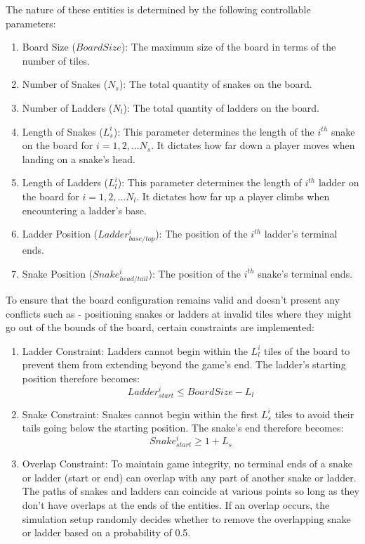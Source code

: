 \documentclass[12pt]{report}
\begin{document}
	The nature of these entities is determined by the following controllable parameters:
	\begin{enumerate}
		\item Board Size ($BoardSize$): The maximum size of the board in terms of the number of tiles.
		\item Number of Snakes ($N_{s}$): The total quantity of snakes on the board.
		\item Number of Ladders ($N_{l}$): The total quantity of ladders on the board.
		\item Length of Snakes ($L^{i}_{s}$): This parameter determines the length of the $i^{th}$ snake on the board for $i=1,2,... N_{s}$. It dictates how far down a player moves when landing on a snake's head.
		\item Length of Ladders ($L^{i}_{l}$): This parameter determines the length of $i^{th}$ ladder on the board for $i=1,2,... N_{l}$. It dictates how far up a player climbs when encountering a ladder's base.
		\item Ladder Position ($Ladder^{i}_{base/top}$): The position of the $i^{th}$ ladder's terminal ends.
		\item Snake Position ($Snake^{i}_{head/tail}$): The position of the $i^{th}$ snake's terminal ends.
	\end{enumerate}
	
	To ensure that the board configuration remains valid and doesn't present any conflicts such as - positioning snakes or ladders at invalid tiles where they might go out of the bounds of the board, certain constraints are implemented:
	
	\begin{enumerate}
		\item Ladder Constraint: Ladders cannot begin within the $L^{i}_{l}$ tiles of the board to prevent them from extending beyond the game's end. The ladder's starting position therefore becomes:  $$Ladder^{i}_{start} \leq BoardSize - L_{l}$$
		\item Snake Constraint: Snakes cannot begin within the first $L^{i}_{s}$ tiles to avoid their tails going below the starting position. The snake's end therefore becomes: $$Snake^{i}_{start}\geq 1 + L_{s}$$
		\item Overlap Constraint: To maintain game integrity, no terminal ends of a snake or ladder (start or end) can overlap with any part of another snake or ladder. The paths of snakes and ladders can coincide at various points so long as they don't have overlaps at the ends of the entities. If an overlap occurs, the simulation setup randomly decides whether to remove the overlapping snake or ladder based on a probability of 0.5.
	\end{enumerate}
	
\end{document}
